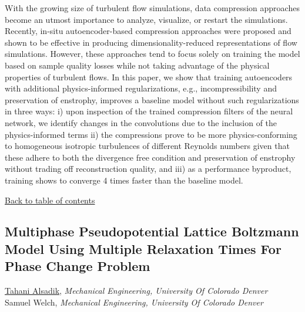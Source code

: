\noindent With the growing size of turbulent flow simulations, data compression approaches become an utmost importance to analyze, visualize, or restart the simulations. Recently, in-situ autoencoder-based compression approaches were proposed and shown to be effective in producing dimensionality-reduced representations of flow simulations. However, these approaches tend to focus solely on training the model based on sample quality losses while not taking advantage of the physical properties of turbulent flows. In this paper, we show that training autoencoders with additional physics-informed regularizations, e.g., incompressibility and preservation of enstrophy, improves a baseline model without such regularizations in three ways: i) upon inspection of the trained compression filters of the neural network, we identify changes in the convolutions due to the inclusion of the physics-informed terms ii) the compressions prove to be more physics-conforming to homogeneous isotropic turbulences of different Reynolds numbers given that these adhere to both the divergence free condition and preservation of enstrophy without trading off reconstruction quality, and iii) as a performance byproduct, training shows to converge 4 times faster than the baseline model. \\ 
\begin{flushright}\vspace{-0.2 in}\hyperlink{toc}{Back to table of contents}\end{flushright}\vspace{-0.2 in}
\hypertarget{TahaniAlsadik}{\subsection*{\color{CUGOLD} Multiphase Pseudopotential Lattice Boltzmann Model Using Multiple Relaxation Times For Phase Change Problem}} \vsp 
\underline{Tahani Alsadik}, \textit{Mechanical Engineering, University Of Colorado Denver}\\ 
{Samuel Welch}, \textit{Mechanical Engineering, University Of Colorado Denver}\\ 
\vspace{-0.1 in} \\ 
\noindent  \\ 
